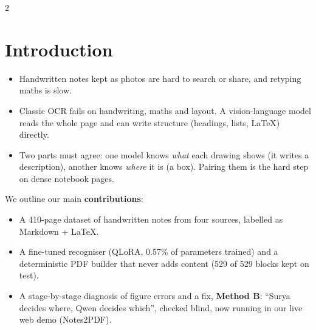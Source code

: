 \documentclass[a0,portrait]{a0poster}
\begin{document}
\begin{minipage}[c]{\linewidth}
\begin{framed}
\begin{multicols}{2}
\section*{Introduction}
\begin{itemize}
	\item Handwritten notes kept as photos are hard to search or share, and retyping maths is slow.
	\item Classic OCR fails on handwriting, maths and layout. A vision-language model reads the
	whole page and can write structure (headings, lists, \LaTeX) directly.
	\item Two parts must agree: one model knows \emph{what} each drawing shows (it writes a
	description), another knows \emph{where} it is (a box). Pairing them is the hard step on dense
	notebook pages.
\end{itemize}
We outline our main \textbf{contributions}:
\begin{itemize}
	\item A 410-page dataset of handwritten notes from four sources, labelled as Markdown + \LaTeX.
	\item A fine-tuned recogniser (QLoRA, 0.57\% of parameters trained) and a deterministic PDF
	builder that never adds content (529 of 529 blocks kept on test).
	\item A stage-by-stage diagnosis of figure errors and a fix, \textbf{Method B}: ``Surya decides
	where, Qwen decides which'', checked blind, now running in our live web demo (Notes2PDF).
\end{itemize}


\end{multicols}
\end{framed}
\end{minipage}
\end{document}

